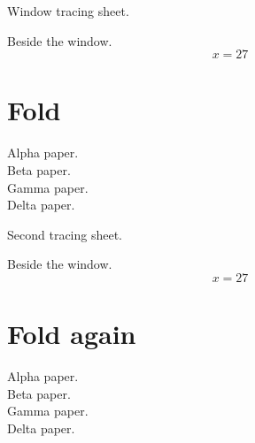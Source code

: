 \documentclass[a4paper,11pt]{ltjsarticle}
\begin{document}
\noindent Window tracing sheet.\par
\vspace*{199mm}
\noindent Beside the window.
\[ x = 27 \]
\section{Fold}
\noindent Alpha paper.\\Beta paper.\\Gamma paper.\\Delta paper.
\clearpage

\noindent Second tracing sheet.\par
\vspace*{229mm}
\noindent Beside the window.
\[ x = 27 \]
\section{Fold again}
\noindent Alpha paper.\\Beta paper.\\Gamma paper.\\Delta paper.
\end{document}

